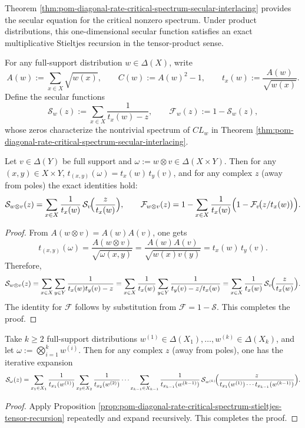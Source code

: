 Theorem \ref{thm:pom-diagonal-rate-critical-spectrum-secular-interlacing} provides the secular equation for the critical nonzero spectrum.
Under product distributions, this one-dimensional secular function satisfies an exact multiplicative Stieltjes recursion in the tensor-product sense.

\begin{proposition}\label{prop:pom-diagonal-rate-critical-spectrum-stieltjes-tensor-recursion}
For any full-support distribution \(w\in\Delta(X)\), write
\[
A(w):=\sum_{x\in X}\sqrt{w(x)},\qquad
C(w):=A(w)^2-1,
\qquad
t_x(w):=\frac{A(w)}{\sqrt{w(x)}}.
\]
Define the secular functions
\[
\mathcal S_w(z):=\sum_{x\in X}\frac{1}{t_x(w)-z},
\qquad
\mathcal F_w(z):=1-\mathcal S_w(z),
\]
whose zeros characterize the nontrivial spectrum of \(CL_w\) in Theorem \ref{thm:pom-diagonal-rate-critical-spectrum-secular-interlacing}.
\par
Let \(v\in\Delta(Y)\) be full support and \(\omega:=w\otimes v\in\Delta(X\times Y)\).
Then for any \((x,y)\in X\times Y\),
\(
t_{(x,y)}(\omega)=t_x(w)\,t_y(v)
\),
and for any complex \(z\) (away from poles) the exact identities hold:
\[
\mathcal S_{w\otimes v}(z)
=\sum_{x\in X}\frac{1}{t_x(w)}\,\mathcal S_v\!\Bigl(\frac{z}{t_x(w)}\Bigr),
\qquad
\mathcal F_{w\otimes v}(z)
=1-\sum_{x\in X}\frac{1}{t_x(w)}\Bigl(1-\mathcal F_v\!\bigl(z/t_x(w)\bigr)\Bigr).
\]
\end{proposition}
\begin{proof}
From \(A(w\otimes v)=A(w)A(v)\), one gets
\[
t_{(x,y)}(\omega)
=\frac{A(w\otimes v)}{\sqrt{\omega(x,y)}}
=\frac{A(w)A(v)}{\sqrt{w(x)v(y)}}
=t_x(w)\,t_y(v).
\]
Therefore,
\[
\mathcal S_{w\otimes v}(z)
=\sum_{x\in X}\sum_{y\in Y}\frac{1}{t_x(w)t_y(v)-z}
=\sum_{x\in X}\frac{1}{t_x(w)}\sum_{y\in Y}\frac{1}{t_y(v)-z/t_x(w)}
=\sum_{x\in X}\frac{1}{t_x(w)}\,\mathcal S_v\!\Bigl(\frac{z}{t_x(w)}\Bigr).
\]
The identity for \(\mathcal F\) follows by substitution from \(\mathcal F=1-\mathcal S\). This completes the proof.
\end{proof}

\begin{corollary}\label{cor:pom-diagonal-rate-critical-spectrum-stieltjes-tensor-recursion-kfold}
Take \(k\ge 2\) full-support distributions \(w^{(1)}\in\Delta(X_1),\dots,w^{(k)}\in\Delta(X_k)\), and let \(\omega:=\bigotimes_{i=1}^k w^{(i)}\).
Then for any complex \(z\) (away from poles), one has the iterative expansion
\[
\mathcal S_{\omega}(z)
=\sum_{x_1\in X_1}\frac{1}{t_{x_1}(w^{(1)})}
\sum_{x_2\in X_2}\frac{1}{t_{x_2}(w^{(2)})}\cdots
\sum_{x_{k-1}\in X_{k-1}}\frac{1}{t_{x_{k-1}}(w^{(k-1)})}\,
\mathcal S_{w^{(k)}}\!\Bigl(\frac{z}{t_{x_1}(w^{(1)})\cdots t_{x_{k-1}}(w^{(k-1)})}\Bigr).
\]
\end{corollary}
\begin{proof}
Apply Proposition \ref{prop:pom-diagonal-rate-critical-spectrum-stieltjes-tensor-recursion} repeatedly and expand recursively. This completes the proof.
\end{proof}

